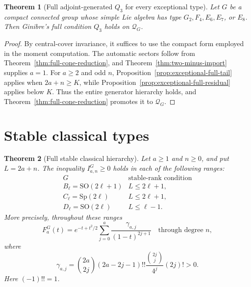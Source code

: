 \documentclass[11pt,reqno]{amsart}
\theoremstyle{plain}
\newtheorem{theorem}{Theorem}[section]
\theoremstyle{definition}
\newcommand{\Qcone}{\mathcal Q}
\begin{document}
\begin{theorem}[Full adjoint-generated $Q_3$ for every exceptional type]
\label{thm:exceptional-full-cone}
Let $G$ be a compact connected group whose simple Lie algebra has type
$G_2,F_4,E_6,E_7$, or $E_8$.  Then Ginibre's full condition $Q_3$ holds on
$\Qcone_G$.
\end{theorem}

\begin{proof}
By central-cover invariance, it suffices to use the compact form employed in
the moment computation.  The automatic sectors follow from
Theorem~\ref{thm:full-cone-reduction}, and
Theorem~\ref{thm:two-minus-import} supplies $a=1$.  For
$a\geq2$ and odd $n$, Proposition~\ref{prop:exceptional-full-tail} applies
when $2a+n\geq K$, while
Proposition~\ref{prop:exceptional-full-residual} applies below $K$.  Thus the
entire generator hierarchy holds, and
Theorem~\ref{thm:full-cone-reduction} promotes it to $\Qcone_G$.
\end{proof}

\section{Stable classical types}

\begin{theorem}[Full stable classical hierarchy]
\label{thm:stable-bcd-full}
Let $a\geq1$ and $n\geq0$, and put $L=2a+n$.  The inequality
$I^G_{a,n}\geq0$ holds in each of the following ranges:
\[
 \begin{array}{c|c}
 G&\text{stable-rank condition}\\
 \hline
 B_\ell=\mathrm{SO}(2\ell+1)&L\leq2\ell+1,\\
 C_\ell=\mathrm{Sp}(2\ell)&L\leq2\ell+1,\\
 D_\ell=\mathrm{SO}(2\ell)&L\leq\ell-1.
 \end{array}
\]
More precisely, throughout these ranges
\[
 F_a^G(t)=e^{-t+t^2/2}
 \sum_{j=0}^{a}\frac{\gamma_{a,j}}{(1-t)^{2j+1}}
 \quad\text{through degree }n,
\]
where
\[
 \gamma_{a,j}
 =\binom{2a}{2j}(2a-2j-1)!!
   \frac{\binom{2j}{j}}{4^j}(2j)!>0.
\]
Here $(-1)!!=1$.
\end{theorem}
\end{document}
